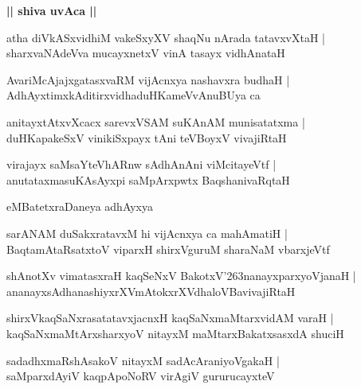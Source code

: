 \documentclass[twoside,12pt,openright]{book}
\def\S{\char'263}
\newcounter{shloka}[chapter]
\def\uvaca#1{\centerline{{\large\textbf{#1}}}}
\begin{document}
\uvaca{|| shiva uvAca ||}

\begin{shloka}%
atha diVkASxvidhiM vakeSxyXV shaqNu nArada tatavxvXtaH |\\
sharxvaNAdeVva mucayxnetxV vinA tasayx vidhAnataH 
\end{shloka}

\begin{shloka}%
AvariMcAjajxgatasxvaRM vijAcnxya nashavxra budhaH |\\
AdhAyxtimxkAditirxvidhaduHKameVvAnuBUya ca 
\end{shloka}

\begin{shloka}%
anitayxtAtxvXcacx sarevxVSAM suKAnAM munisatatxma |\\
duHKapakeSxV vinikiSxpayx tAni teVBoyxV vivajiRtaH 
\end{shloka}

\begin{shloka}%
virajayx saMsaYteVhARnw sAdhAnAni viMcitayeVtf |\\
anutataxmasuKAsAyxpi saMpArxpwtx BaqshanivaRqtaH 
\end{shloka}

\begin{center}
eMBatetxraDaneya adhAyxya
\end{center}

\begin{shloka}%
sarANAM duSakxratavxM hi vijAcnxya ca mahAmatiH |\\
BaqtamAtaRsatxtoV viparxH shirxVguruM sharaNaM vbarxjeVtf 
\end{shloka}

\begin{shloka}%
shAnotXv vimatasxraH kaqSeNxV BakotxV\S nanayxparxyoVjanaH |\\
ananayxsAdhanashiyxrXVmAtokxrXVdhaloVBavivajiRtaH
\end{shloka}

\begin{shloka}%
shirxVkaqSaNxrasatatavxjacnxH kaqSaNxmaMtarxvidAM varaH |\\
kaqSaNxmaMtArxsharxyoV nitayxM maMtarxBakatxsasxdA shuciH 
\end{shloka}

\begin{shloka}%
sadadhxmaRshAsakoV nitayxM sadAcAraniyoVgakaH |\\
saMparxdAyiV kaqpApoNoRV virAgiV gururucayxteV
\end{shloka}
\end{document}
